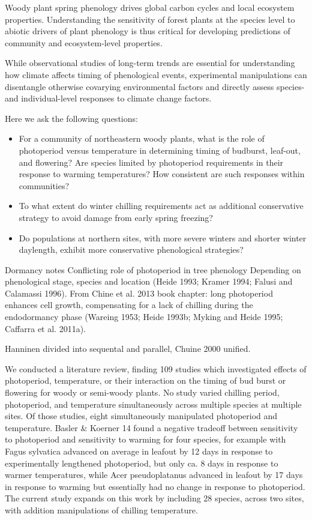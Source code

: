 \documentclass{article}
\begin{document}
Woody plant spring phenology drives global carbon cycles and local ecosystem properties. Understanding the sensitivity of forest plants at the species level to abiotic drivers of plant phenology is thus critical for developing predictions of community and ecosystem-level properties. 

While observational studies of long-term trends are essential for understanding how climate affects timing of phenological events, experimental manipulations can disentangle otherwise covarying environmental factors and directly assess species- and individual-level responses to climate change factors. 

Here we ask the following questions:
\begin{itemize}
\item{For a community of northeastern woody plants, what is the role of photoperiod versus temperature in determining timing of budburst, leaf-out, and flowering? Are species limited by photoperiod requirements in their response to warming temperatures? How consistent are such responses within communities?}
\item{To what extent do winter chilling requirements act as additional conservative strategy to avoid damage from early spring freezing?}
\item{Do populations at northern sites, with more severe winters and shorter winter daylength, exhibit more conservative phenological strategies?}
\end{itemize}

Dormancy notes
Conflicting role of photoperiod in tree phenology 
Depending on phenological stage, species and location (Heide 1993; Kramer 1994; Falusi and Calamassi 1996). 
From Chine et al. 2013 book chapter:
long photoperiod enhances cell growth, compensating for a lack of chilling during the endodormancy phase (Wareing 1953; Heide 1993b; Myking and Heide 1995; Caffarra et al. 2011a).

Hanninen divided into sequental and parallel, Chuine 2000 unified.

We conducted a literature review, finding 109 studies which investigated effects of photoperiod, temperature, or their interaction on the timing of bud burst or flowering for woody or semi-woody plants.  No study varied chilling period, photoperiod, and temperature simultaneously across multiple species at multiple sites. Of those studies, eight simultaneously manipulated photoperiod and temperature. Basler \& Koerner 14 found a negative tradeoff between sensitivity to photoperiod and sensitivity to warming for four species, for example with Fagus sylvatica advanced on average in leafout by 12 days in response to experimentally lengthened photoperiod, but only ca. 8 days in response to warmer temperatures, while Acer pseudoplatanus advanced in leafout by 17 days in response to warming but essentially had no change in response to photoperiod. The current study expands on this work by including 28 species, across two sites, with addition manipulations of chilling temperature.
\end{document}
